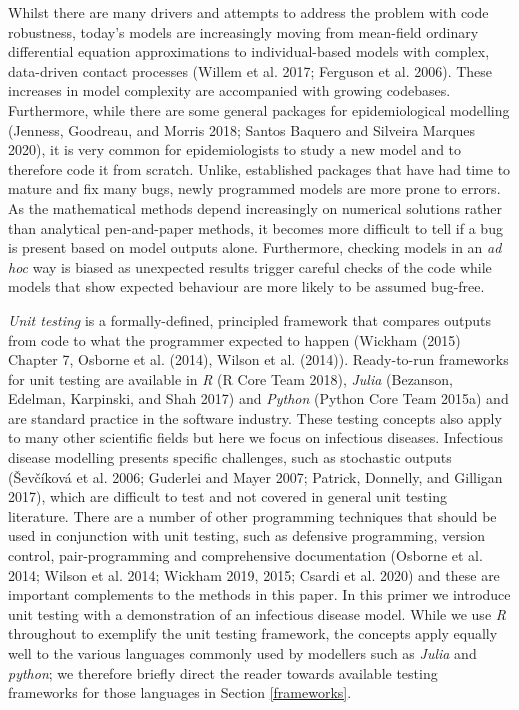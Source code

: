\documentclass[
]{article}
\begin{document}
Whilst there are many drivers and attempts to address the problem with code robustness, today's models are increasingly moving from mean-field ordinary differential equation approximations to individual-based models with complex, data-driven contact processes (Willem et al. 2017; Ferguson et al. 2006).
These increases in model complexity are accompanied with growing codebases.
Furthermore, while there are some general packages for epidemiological modelling (Jenness, Goodreau, and Morris 2018; Santos Baquero and Silveira Marques 2020), it is very common for epidemiologists to study a new model and to therefore code it from scratch.
Unlike, established packages that have had time to mature and fix many bugs, newly programmed models are more prone to errors.
As the mathematical methods depend increasingly on numerical solutions rather than analytical pen-and-paper methods, it becomes more difficult to tell if a bug is present based on model outputs alone.
Furthermore, checking models in an \emph{ad hoc} way is biased as unexpected results trigger careful checks of the code while models that show expected behaviour are more likely to be assumed bug-free.

\emph{Unit testing} is a formally-defined, principled framework that compares outputs from code to what the programmer expected to happen (Wickham (2015) Chapter 7, Osborne et al. (2014), Wilson et al. (2014)).
Ready-to-run frameworks for unit testing are available in \emph{R} (R Core Team 2018), \emph{Julia} (Bezanson, Edelman, Karpinski, and Shah 2017) and \emph{Python} (Python Core Team 2015a) and are standard practice in the software industry.
These testing concepts also apply to many other scientific fields but here we focus on infectious diseases.
Infectious disease modelling presents specific challenges, such as stochastic outputs (Ševčíková et al. 2006; Guderlei and Mayer 2007; Patrick, Donnelly, and Gilligan 2017), which are difficult to test and not covered in general unit testing literature.
There are a number of other programming techniques that should be used in conjunction with unit testing, such as defensive programming, version control, pair-programming and comprehensive documentation (Osborne et al. 2014; Wilson et al. 2014; Wickham 2019, 2015; Csardi et al. 2020) and these are important complements to the methods in this paper.
In this primer we introduce unit testing with a demonstration of an infectious disease model.
While we use \emph{R} throughout to exemplify the unit testing framework, the concepts apply equally well to the various languages commonly used by modellers such as \emph{Julia} and \emph{python}; we therefore briefly direct the reader towards available testing frameworks for those languages in Section \ref{frameworks}.
\end{document}
